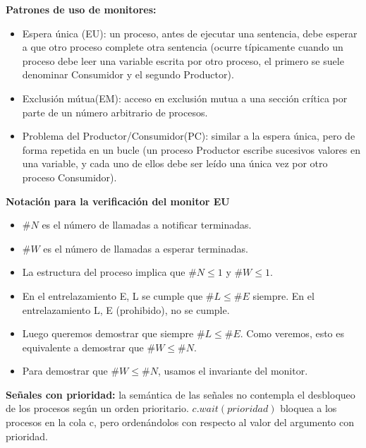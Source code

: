 \documentclass[a4paper,11pt]{article}
\begin{document}
\textbf{Patrones de uso de monitores:}

\begin{itemize}
\item Espera única (EU): un proceso, antes de ejecutar una sentencia, debe esperar a que otro proceso complete otra sentencia (ocurre típicamente cuando un proceso debe leer una variable escrita por otro proceso, el primero se suele denominar Consumidor y el segundo Productor).

\item Exclusión mútua(EM): acceso en exclusión mutua a una sección crítica por parte de un número arbitrario de procesos.

\item Problema del Productor/Consumidor(PC): similar a la espera única, pero de forma repetida en un bucle (un proceso Productor escribe sucesivos valores en una variable, y cada uno de ellos debe ser leído una única vez por otro proceso Consumidor).
\end{itemize}

\textbf{Notación para la verificación del monitor EU}
\begin{itemize}
\item $\#N$ es el número de llamadas a notificar terminadas.

\item $\#W$ es el número de llamadas a esperar terminadas.

\item La estructura del proceso implica que $\#N \leq 1$ y $\#W \leq 1$.

\item En el entrelazamiento E, L se cumple que $\#L \leq \#E$ siempre. En el entrelazamiento L, E (prohibido), no se cumple.

\item Luego queremos demostrar que siempre $\#L \leq \#E$. Como veremos, esto es equivalente a demostrar que $\#W \leq \#N$.

\item Para demostrar que $\#W \leq \#N$, usamos el invariante del monitor.
\end{itemize}

\textbf{Señales con prioridad:} la semántica de las señales no contempla el desbloqueo de los procesos según un orden prioritario. $c.wait(prioridad)$ bloquea a los procesos en la cola c, pero ordenándolos con respecto al valor del argumento con prioridad.
\end{document}
